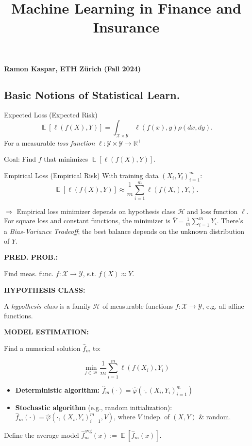 \documentclass[a4paper,10pt]{article}
\title{\textbf{Machine Learning in Finance and Insurance}}
\author{}
\date{}
\newenvironment{myitemize}
{\vspace{-0.25cm}\begin{itemize}}
{\end{itemize}}
\def\R{\mathbb{R}}
\DeclareMathOperator{\E}{\mathbb{E}}
\newcommand{\subtitle}[1]{\vspace{0.25cm}\begin{normalsize}\textbf{\textcolor{gray!150}{\uppercase{#1}}}\end{normalsize}}
\begin{document}
\maketitle

\vspace{-3cm}


\begin{center}
    \textbf{Ramon Kaspar, ETH Zürich (Fall 2024)}
\end{center}

\begin{small}

\section{Basic Notions of Statistical Learn.}

\begin{subbox}{Expected Loss (Expected Risk)}
\[
\E[\ell(f(X), Y)] = \int_{\mathcal{X} \times \mathcal{Y}} \ell(f(x), y) \rho(dx, dy).
\]
For a measurable \textit{loss function} \(\ell : \mathcal{Y} \times \mathcal{Y} \to \R^+\)
\end{subbox}
Goal: Find \(f\) that minimizes \(\E[\ell(f(X), Y)]\).

\begin{subbox}{Empirical Loss (Empirical Risk)}
    With training data $(X_i, Y_i)_{i=1}^m$: 
    \[
        \E[\ell(f(X), Y)] \approx \frac{1}{m} \sum_{i=1}^m \ell(f(X_i), Y_i).
    \]
\end{subbox}
\(\Rightarrow\) Empirical loss minimizer depends on hypothesis class \(\mathcal{H}\) and loss function \(\ell\). For square loss and constant functions, the minimizer is \(\bar{Y} = \frac{1}{m} \sum_{i=1}^{m} Y_i\). There's a \textit{Bias-Variance Tradeoff}; the best balance depends on the unknown distribution of \(Y\).

\subtitle{Pred. Prob.:} 
Find meas. func. \(f: \mathcal{X} \rightarrow \mathcal{Y}\), s.t. \(f(X) \approx Y\).

\subtitle{Hypothesis Class:} 
A \textit{hypothesis class} is a family \(\mathcal{H}\) of measurable functions \(f : \mathcal{X} \to \mathcal{Y}\), e.g. all affine functions.

\subtitle{Model Estimation:}
Find a numerical solution \(\hat{f}_m\) to:
\begin{footnotesize}  
\[
\min_{f \in \mathcal{H}} \frac{1}{m} \sum_{i=1}^m \ell(f(X_i), Y_i)
\]
\end{footnotesize}
\begin{myitemize}
    \item \textbf{Deterministic algorithm:} \(\hat{f}_m(\cdot) = \hat{\varphi}\left( \cdot , (X_i, Y_i)_{i=1}^m \right)\)
    \item \textbf{Stochastic algorithm} (e.g., random initialization): \(\hat{f}_m(\cdot) = \hat{\varphi}\left( \cdot , (X_i, Y_i)_{i=1}^m, V \right)\), where \(V\) indep. of \((X, Y)\) \& random.
\end{myitemize}
Define the average model \(\hat{f}_m^{\text{avg}}(x) := \E[\hat{f}_m(x)]\).


\end{small}
\end{document}
